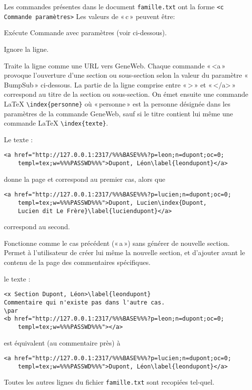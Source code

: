 Les commandes \gwtol{} présentes dans le document \verb|famille.txt| ont la forme
\verb|<c Commande paramètres>|
Les valeurs de «\,c\,» peuvent être:
\begin{description}[style=nextline]
\item[x] Exécute Commande avec paramètres (voir ci-dessous).
\item[y] Ignore la ligne.
\item[a] Traite la ligne comme une URL vers GeneWeb.
Chaque commande «\,<a\,» provoque l'ouverture d'une section ou sous-section selon
la valeur du paramètre «\,BumpSub\,» ci-dessous. La partie de la ligne comprise entre
«\,>\,» et «\,</a>\,» correspond au titre de la section ou sous-section.
On émet ensuite une commande \LaTeX{} \verb|\index{personne}| où «\,personne\,» est
la personne désignée dans les paramètres de la commande GeneWeb, sauf si le
titre contient lui même une commande \LaTeX{} \verb|\index{texte}|.

Le texte :
\begin{verbatim}
<a href="http://127.0.0.1:2317/%%%BASE%%%?p=leon;n=dupont;oc=0;
    templ=tex;w=%%%PASSWD%%%">Dupont, Léon\label{leondupont}</a>
\end{verbatim}
donne la page \pageref{leondupont} et correspond au premier cas, alors que
\begin{verbatim}
<a href="http://127.0.0.1:2317/%%%BASE%%%?p=lucien;n=dupont;oc=0;
    templ=tex;w=%%%PASSWD%%%">Dupont, Lucien\index{Dupont,
    Lucien dit Le Frère}\label{luciendupont}</a>
\end{verbatim}
correspond au second.
\item[b] Fonctionne comme le cas précédent («\,a\,») sans générer de
nouvelle section. Permet à l'utilisateur de créer lui même la nouvelle
section, et d'ajouter avant le contenu de la page des commentaires spécifiques.

le texte :
\begin{verbatim}
<x Section Dupont, Léon>\label{leondupont}
Commentaire qui n'existe pas dans l'autre cas.
\par
<b href="http://127.0.0.1:2317/%%%BASE%%%?p=leon;n=dupont;oc=0;
    templ=tex;w=%%%PASSWD%%%"></a>
\end{verbatim}
est équivalent (au commentaire près) à 
\begin{verbatim}
<a href="http://127.0.0.1:2317/%%%BASE%%%?p=lucien;n=dupont;oc=0;
    templ=tex;w=%%%PASSWD%%%">Dupont, Léon\label{leondupont}</a>
\end{verbatim}
\end{description}
Toutes les autres lignes du fichier \verb|famille.txt| sont recopiées tel-quel.

